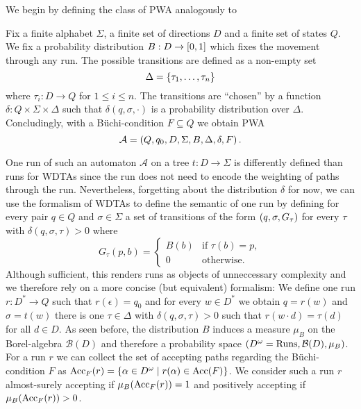 We begin by defining the class of \ac{PWA} analogously to
\cite[Definition 4.1.1]{RandAutoInfTrees} 
\begin{definition}
  Fix a finite alphabet $\Sigma$, a finite set of directions $D$ and a finite
  set of states $Q$. We fix a probability distribution
  $B:D\rightarrow\left[0,1\right]$ which fixes the movement through any run. The
  possible transitions are defined as a non-empty set
  \begin{equation*}
    \Delta = \left\{ \tau_{1},\dots,\tau_{n} \right\}
  \end{equation*}
  where $\tau_{i}:D\rightarrow Q$ for $1\leq i\leq n$.
  The transitions are \enquote{chosen} by a function 
  $\delta:Q\times\Sigma\times\Delta$ such that
  $\delta(q,\sigma,\cdot)$ is a probability distribution over $\Delta$.
  Concludingly, with a Büchi-condition $F\subseteq Q$ we obtain \ac{PWA}
  \begin{equation*}
    \mathcal{A} = \left(Q, q_{0}, D, \Sigma, B, \Delta, \delta, F\right).
  \end{equation*}
\end{definition}
One run of such an automaton $\mathcal{A}$ on a tree $t:D\rightarrow\Sigma$ is
differently defined than runs for \acp{WDTA} since the run does not need to
encode the weighting of paths through the run. Nevertheless, forgetting about 
the distribution $\delta$ for now, we can use the formalism of \acp{WDTA} to 
define the semantic of one run by defining for every pair $q\in Q$ and 
$\sigma\in\Sigma$ a set of transitions of the form $\left(q,\sigma,G_{\tau}\right)$
for every $\tau$ with $\delta(q,\sigma,\tau)>0$ where
\begin{equation*}
  G_{\tau}(p,b) = \begin{cases}
    B(b)&\text{if }\tau(b) = p,\\
    0&\text{otherwise}.
  \end{cases}
\end{equation*}
Although sufficient, this renders runs as objects of unneccessary complexity 
and we therefore rely on a more concise (but equivalent) formalism:
We define one run $r:D^{*}\rightarrow Q$ such that $r(\epsilon) = q_{0}$ and 
for every $w\in D^{*}$ we obtain $q = r(w)$ and $\sigma = t(w)$ there is one
$\tau\in\Delta$ with $\delta(q,\sigma,\tau)>0$ such that $r(w\cdot d)=\tau(d)$ 
for all $d\in D$. As seen before, the distribution $B$ induces a measure 
$\mu_{B}$ on the Borel-algebra $\mathcal{B}(D)$ and therefore a probability 
space $\left(D^{\omega} = \operatorname{Runs}, \mathcal{B}(D), \mu_{B}\right)$. For a run $r$ we 
can collect the set of accepting paths regarding the Büchi-condition $F$ as 
$\operatorname{Acc}_{F}(r) = \left\{\alpha\in D^{\omega}\mid r(\alpha)\in \operatorname{Acc}(F)\right\}$. We 
consider such a run $r$ almost-surely accepting if $\mu_{B}(\operatorname{Acc}_{F}(r))=1$ and 
positively accepting if $\mu_{B}(\operatorname{Acc}_{F}(r))>0$.

